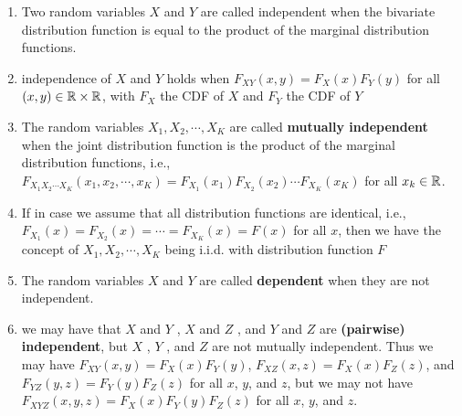 \begin{enumerate}
    \item Two random variables $X$ and $Y$ are called independent when the bivariate distribution function is equal to the product of the marginal distribution functions.
    \hfill \cite{statistics/book/Statistics-for-Data-Scientists/Maurits-Kaptein}

    \item independence of $X$ and $Y$ holds when $F _{X Y} (x, y) = F_X (x)F_Y (y)$ for all $(x, y) \in \mathbb{R} \times \mathbb{R}$, with $F _X$ the CDF of $X$ and $F_Y$ the CDF of $Y$
    \hfill \cite{statistics/book/Statistics-for-Data-Scientists/Maurits-Kaptein}

    \item The random variables $X_1 , X_2, \cdots , X_K$ are called \textbf{mutually independent} when the joint distribution function is the product of the marginal distribution functions, i.e.,
    \hfill \cite{statistics/book/Statistics-for-Data-Scientists/Maurits-Kaptein}
    \\
    $F _{X_1 X_2 \cdots X_K} (x_1, x_2, \cdots , x_K ) = F _{X_1} (x_1)F_{X_2} (x_2) \cdots F_{X_K} (x_K )$ for all $x_k \in \mathbb{R}$.
    \hfill \cite{statistics/book/Statistics-for-Data-Scientists/Maurits-Kaptein}

    \item If in case we assume that all distribution functions are identical, i.e., $F_ {X_1} (x) = F _{X_2} (x) = \cdots = F _{X_K} (x) = F(x)$ for all $x$, then we have the concept of $X_1 , X_2, \cdots , X_K$ being i.i.d. with distribution function $F$
    \hfill \cite{statistics/book/Statistics-for-Data-Scientists/Maurits-Kaptein}

    \item The random variables $X$ and $Y$ are called \textbf{dependent} when they are not independent.
    \hfill \cite{statistics/book/Statistics-for-Data-Scientists/Maurits-Kaptein}

    \item we may have that $X$ and $Y$ , $X$ and $Z$ , and $Y$ and $Z$ are \textbf{(pairwise) independent}, but $X$ , $Y$ , and $Z$ are not mutually independent.
    Thus we may have $F _{X Y} (x, y) = F _X (x)F_Y (y)$, $F _{X Z} (x, z) = F_X (x)F_Z (z)$, and $F_{Y Z} (y, z) = F_Y (y)F_Z (z)$ for all $x$, $y$, and $z$, but we may not have $F _{X Y Z} (x, y, z) = F_X (x)F_Y (y)F_Z (z)$ for all $x$, $y$, and $z$.
    \hfill \cite{statistics/book/Statistics-for-Data-Scientists/Maurits-Kaptein}


\end{enumerate}
